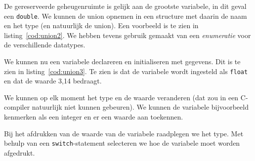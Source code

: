 
De gereserveerde geheugenruimte is gelijk aan de grootste variabele, in dit geval een \texttt{double}. We kunnen de union opnemen in een structure met daarin de naam en het type (en natuurlijk de union). Een voorbeeld is te zien in listing~\ref{cod:union2}. We hebben tevens gebruik gemaakt van een \textsl{enumeratie} voor de verschillende datatypes.


We kunnen nu een variabele declareren en initialiseren met gegevens. Dit is te zien in listing~\ref{cod:union3}. Te zien is dat de variabele wordt ingesteld als \texttt{float} en dat de waarde 3,14 bedraagt.


We kunnen op elk moment het type en de waarde veranderen (dat zou in een C-compiler natuurlijk niet kunnen gebeuren). We kunnen de variabele bijvoorbeeld kenmerken als een integer en er een waarde aan toekennen.


Bij het afdrukken van de waarde van de variabele raadplegen we het type. Met behulp van een \texttt{switch}-statement selecteren we hoe de variabele moet worden afgedrukt.


\basic